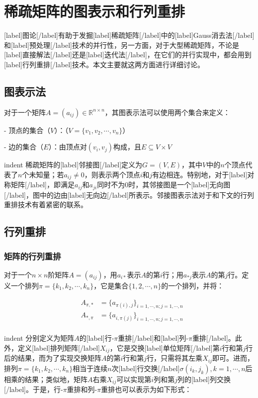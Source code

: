 \documentclass[UTF8,nofonts]{ctexart}
\begin{document}
\section*{稀疏矩阵的图表示和行列重排}

[label]图论[/label]有助于发掘[label]稀疏矩阵[/label]中的[label]Gauss消去法[/label]和[label]预处理[/label]技术的并行性，另一方面，对于大型稀疏矩阵，不论是[label]直接解法[/label]还是[label]迭代法[/label]，在它们的并行实现中，都会用到[label]行列重排[/label]技术。本文主要就这两方面进行详细讨论。

\subsection*{图表示法}

对于一个矩阵$A=(a_{ij})\in\mathbb{R}^{n \times n}$，其图表示法可以使用两个集合来定义：

- 顶点的集合（$V$）：（$V=\{v_1,v_2,\cdots,v_n\}$）

- 边的集合（$E$）：由顶点对$(v_i,v_j)$构成，且$E\subseteq V\times V$

indent 稀疏矩阵的[label]邻接图[/label]定义为$G=(V,E)$，其中$V$中的$n$个顶点代表了$n$个未知量；若$a_{ij} \neq 0$，则表示两个顶点$i$和$j$有边相连。特别地，对于[label]对称矩阵[/label]，即满足$a_{ij}$和$a_{ji}$同时不为$0$时，其邻接图是一个[label]无向图[/label]，图中的边由[label]无向边[/label]所表示。邻接图表示法对于和下文的行列重排技术有着紧密的联系。

\subsection*{行列重排}

\subsubsection*{矩阵的行列重排}

对于一个$n \times n$阶矩阵$A=(a_{ij})$，用$a_{i*}$表示$A$的第$i$行；用$a_{*j}$表示$A$的第$j$行。定义一个排列$\pi=\{k_1,k_2,\cdots,k_n\}$，它是集合$\{1,2,\cdots,n\}$的一个排列，并将：

\begin{eqnarray*}
& A_{\pi,\ast}&=\{a_{\pi(i),j}\}_{i=1,\cdots,n;j=1,\cdots,n} \\
& A_{\ast,\pi}&=\{a_{i,\pi(j)}\}_{i=1,\cdots,n;j=1,\cdots,n} \\
\end{eqnarray*}

indent 分别定义为矩阵$A$的[label]行-$\pi$重排[/label]和[label]列-$\pi$重排[/label]。此外，定义[label]排列矩阵[/label]$X_{ij}$，它是交换[label]单位矩阵[/label]第$i$行和第$j$行后的结果，而为了实现交换矩阵$A$的第$i$行和第$j$行，只需将其左乘$X_{ij}$即可。进而，排列$\pi=\{k_1,k_2,\cdots,k_n\}$相当于连续$n$次[label]行交换[/label]$\sigma(i_k,j_k),k=1,\cdots,n$后相乘的结果；类似地，矩阵$A$右乘$X_{ij}$可以实现第$i$列和第$j$列的[label]列交换[/label]。于是，行-$\pi$重排和列-$\pi$重排也可以表示为如下形式：
\end{document}
